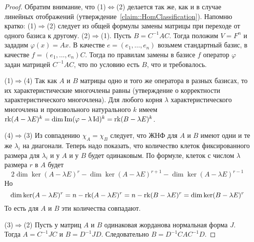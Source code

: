\begin{proof}
Обратим внимание, что (1)$\Leftrightarrow$(2) делается так же, как и в случае линейных отображений (утверждение~\ref{claim::HomClassification}).
Напомню кратко:
(1)$\Rightarrow$(2) следует из общей формулы замены матрицы при переходе от одного базиса к другому.
(2)$\Rightarrow$(1).
Пусть $B = C^{-1}AC$.
Тогда положим $V = F^n$ и зададим $\varphi(x) = Ax$.
В качестве $e=(e_1,\ldots,e_n)$ возьмем стандартный базис, в качестве $f = (e_1,\ldots,e_n)C$.
Тогда по правилам замены в базисе $f$ оператор $\varphi$ задан матрицей $C^{-1}AC$, что по условию есть $B$, что и требовалось.

(1)$\Rightarrow$(4) Так как $A$ и $B$ матрицы одно и того же оператора в разных базисах, то их характеристические многочлены равны (утверждение о корректности характеристического многочлена).
Для любого корня $\lambda$ характеристического многочлена и произвольного натурального $k$ имеем $\operatorname{rk} (A - \lambda E)^k = \dim \operatorname{Im}(\varphi - \lambda \operatorname{Id})^k = \operatorname{rk} (B - \lambda E)^k$.

(4)$\Rightarrow$(3) Из совпадению $\chi_A = \chi_B$ следует, что ЖНФ для $A$ и $B$ имеют одни и те же $\lambda_i$ на диагонали.
Теперь надо показать, что количество клеток фиксированного размера для $\lambda_i$ и у $A$ и у $B$ будет одинаковым.
По формуле, клеток с числом $\lambda$ размера $r$ в $A$ будет
\[
2\dim \ker (A - \lambda E)^r - \dim \ker (A - \lambda E)^{r+1} - \dim \ker (A - \lambda E)^{r-1}
\]
Но 
\[
\dim \ker (A - \lambda E)^r = n - \operatorname{rk} (A - \lambda E)^r = n - \operatorname{rk}(B - \lambda E)^r = \dim \ker (B - \lambda E)^r
\]	
То есть для $A$ и $B$ эти количества совпадают.

(3)$\Rightarrow$(2) Пусть у матриц $A$ и $B$ одинаковая жорданова нормальная форма $J$.
Тогда $A = C^{-1} J C$ и $B = D^{-1} J D$.
Следовательно $B = D^{-1}C A C^{-1}D$.
\end{proof}
